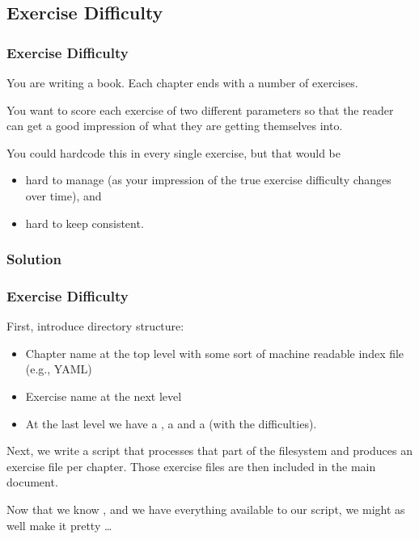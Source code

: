 {\subsection{Exercise Difficulty}
\begin{frame}[fragile]
  \frametitle{Exercise Difficulty}
  \pause
  \vspace{3mm}
  You are writing a book. Each chapter ends with a number of exercises.
  
  \vspace{5mm}
  You want to score each exercise of two different parameters so that the reader can get a good impression of what they are getting themselves into.
  
  \pause
  \vspace{5mm}
  You could hardcode this in every single exercise, but that would be
  \begin{itemize}
    \item hard to manage (as your impression of the true exercise difficulty changes over time), and
    \item hard to keep consistent.
  \end{itemize}
\end{frame}

\subsubsection{Solution}
\begin{frame}[fragile]
  \frametitle{Exercise Difficulty }
  \pause
  \vspace{3mm}
  First, introduce directory structure:
  \begin{itemize}
    \item Chapter name at the top level with some sort of machine readable index file (e.g., YAML)
    \item Exercise name at the next level
    \item At the last level we have a , a  and a  (with the difficulties).
  \end{itemize}
  
  \pause
  \vspace{5mm}
  Next, we write a script that processes that part of the filesystem and produces an exercise file per chapter. Those exercise files are then included in the main document.
  
  \vspace{5mm}
  Now that we know \TikZ, and we have everything available to our script, we might as well make it pretty \ldots
\end{frame}

}
